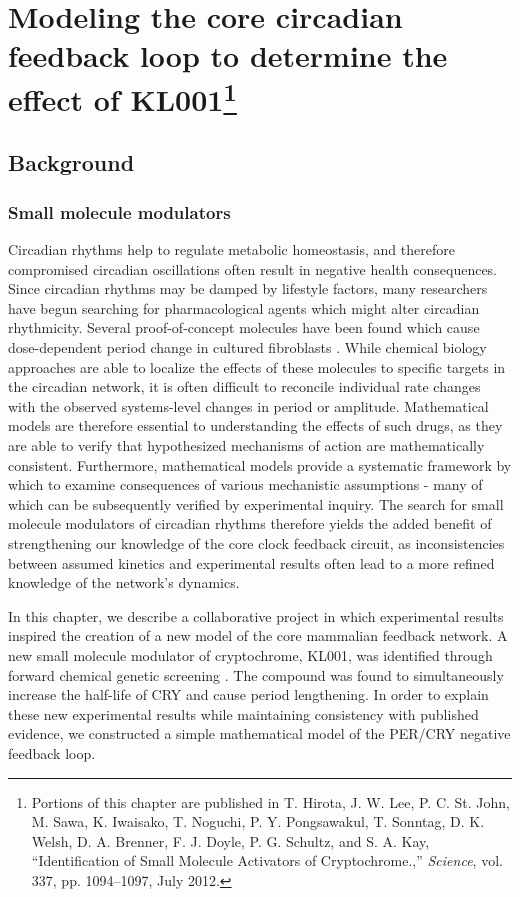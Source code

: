 \chapter[Modeling the core circadian feedback loop to determine the effect of KL001]{Modeling the core circadian feedback loop to determine the effect of KL001\footnote{ Portions of this chapter are published in T. Hirota, J. W. Lee, P. C. St. John, M. Sawa, K. Iwaisako, T. Noguchi, P. Y. Pongsawakul, T. Sonntag, D. K. Welsh, D. A. Brenner, F. J. Doyle, P. G. Schultz, and S. A. Kay, ``Identification of Small Molecule Activators of Cryptochrome.,'' {\itshape Science}, vol. 337, pp. 1094–1097, July 2012.}}\label{chap:model}

\section{Background}

\subsection{Small molecule modulators}
Circadian rhythms help to regulate metabolic homeostasis, and therefore compromised circadian oscillations often result in negative health consequences.
Since circadian rhythms may be damped by lifestyle factors, many researchers have begun searching for pharmacological agents which might alter circadian rhythmicity.
Several proof-of-concept molecules have been found which cause dose-dependent period change in cultured fibroblasts \cite{Chen2013}.
While chemical biology approaches are able to localize the effects of these molecules to specific targets in the circadian network, it is often difficult to reconcile individual rate changes with the observed systems-level changes in period or amplitude.
Mathematical models are therefore essential to understanding the effects of such drugs, as they are able to verify that hypothesized mechanisms of action are mathematically consistent.
Furthermore, mathematical models provide a systematic framework by which to examine consequences of various mechanistic assumptions - many of which can be subsequently verified by experimental inquiry.
The search for small molecule modulators of circadian rhythms therefore yields the added benefit of strengthening our knowledge of the core clock feedback circuit, as inconsistencies between assumed kinetics and experimental results often lead to a more refined knowledge of the network's dynamics.

In this chapter, we describe a collaborative project in which experimental results inspired the creation of a new model of the core mammalian feedback network.
A new small molecule modulator of cryptochrome, KL001, was identified through forward chemical genetic screening \cite{Hirota2012}.
The compound was found to simultaneously increase the half-life of CRY and cause period lengthening.
In order to explain these new experimental results while maintaining consistency with published evidence, we constructed a simple mathematical model of the PER/CRY negative feedback loop.

